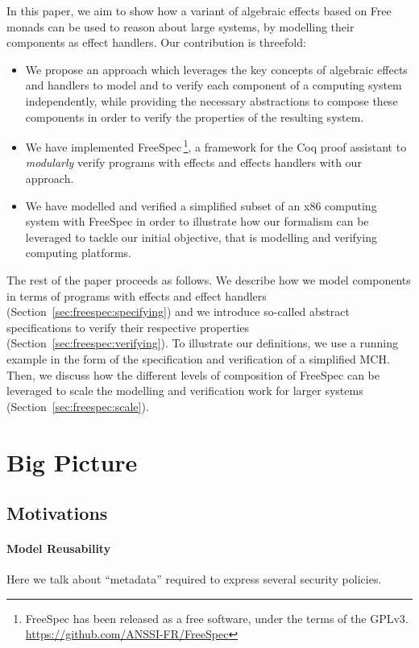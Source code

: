In this paper, we aim to show how a variant of algebraic effects based on Free
monads can be used to reason about large systems, by modelling their components
as effect handlers.
%
Our contribution is threefold:
\begin{itemize}
\item We propose an approach which leverages the key concepts of algebraic
  effects and handlers to model and to verify each component of a computing
  system independently, while providing the necessary abstractions to compose
  these components in order to verify the properties of the resulting system.
%
\item We have implemented FreeSpec\,\footnote{FreeSpec has been released as a
    free software, under the terms of the GPLv3.
    \url{https://github.com/ANSSI-FR/FreeSpec}}, a framework for the Coq proof
  assistant to \emph{modularly} verify programs with effects and effects
  handlers with our approach.
%
\item We have modelled and verified a simplified subset of an x86 computing
  system with FreeSpec in order to illustrate how our formalism can be leveraged
  to tackle our initial objective, that is modelling and verifying computing
  platforms.
\end{itemize}

The rest of the paper proceeds as follows.
%
We describe how we model components in terms of programs with effects and effect
handlers (Section~\ref{sec:freespec:specifying}) and we introduce so-called
abstract specifications to verify their respective properties
(Section~\ref{sec:freespec:verifying}).
%
To illustrate our definitions, we use a running example in the form of the
specification and verification of a simplified MCH.
%
Then, we discuss how the different levels of composition of FreeSpec can be
leveraged to scale the modelling and verification work for larger systems
(Section~\ref{sec:freespec:scale}).

\section{Big Picture}


\subsection{Motivations}

\paragraph{Model Reusability}
%
Here we talk about ``metadata'' required to express several security policies.

